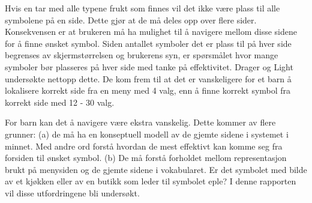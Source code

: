 Hvis en tar med alle typene frukt som finnes vil det ikke være plass til alle symbolene på en side. Dette gjør at de må deles opp over flere sider. Konsekvensen er at brukeren må ha mulighet til å navigere mellom disse sidene for å finne ønsket symbol. Siden antallet symboler det er plass til på hver side begrenses av skjermstørrelsen og brukerens syn, er spørsmålet hvor mange symboler bør plasseres på hver side med tanke på effektivitet. 
Drager og Light \cite{aac} undersøkte nettopp dette. De kom frem til at det er vanskeligere for et barn å lokalisere korrekt side fra en meny med 4 valg, enn å finne korrekt symbol fra korrekt side med 12 - 30 valg.


For barn kan det å navigere være ekstra vanskelig. Dette kommer av flere grunner: (a) de må ha en konseptuell modell av de gjemte sidene i systemet i minnet. Med andre ord forstå hvordan de mest effektivt kan komme seg fra forsiden til ønsket symbol. (b) De må forstå forholdet mellom representasjon brukt på menysiden og de gjemte sidene i vokabularet. Er det symbolet med bilde av et kjøkken eller av en butikk som leder til symbolet eple? I denne rapporten vil disse utfordringene bli undersøkt.


